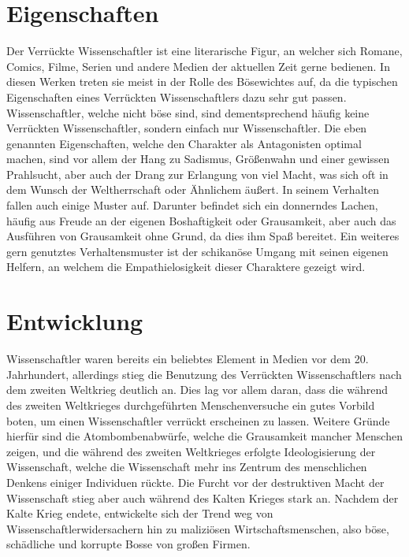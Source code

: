 \documentclass[12pt]{scrreprt}
\begin{document}
\section{Eigenschaften}
	\label{sec:eigenschaften}
Der Verrückte Wissenschaftler ist eine literarische Figur, an welcher sich Romane, Comics, Filme, Serien und andere Medien der aktuellen Zeit gerne bedienen.
In diesen Werken treten sie meist in der Rolle des Bösewichtes auf, da die typischen Eigenschaften eines Verrückten Wissenschaftlers dazu sehr gut passen.
Wissenschaftler, welche nicht böse sind, sind dementsprechend häufig keine Verrückten Wissenschaftler, sondern einfach nur Wissenschaftler. 
Die eben genannten Eigenschaften, welche den Charakter als Antagonisten optimal machen, sind vor allem der Hang zu Sadismus, Größenwahn und einer gewissen Prahlsucht, aber auch der Drang zur Erlangung von viel Macht, was sich oft in dem Wunsch der Weltherrschaft oder Ähnlichem äußert.
In seinem Verhalten fallen auch einige Muster auf.
Darunter befindet sich ein donnerndes Lachen, häufig aus Freude an der eigenen Boshaftigkeit oder Grausamkeit, aber auch das Ausführen von Grausamkeit ohne Grund, da dies ihm Spaß bereitet.
Ein weiteres gern genutztes Verhaltensmuster ist der schikanöse Umgang mit seinen eigenen Helfern, an welchem die Empathielosigkeit dieser Charaktere gezeigt wird.
\autocite{wiki:Verrückter_Wissenschaftler}
\section{Entwicklung}
	\label{sec:entwicklung}
Wissenschaftler waren bereits ein beliebtes Element in Medien vor dem 20. Jahrhundert, allerdings stieg die Benutzung des Verrückten Wissenschaftlers nach dem zweiten Weltkrieg deutlich an.
Dies lag vor allem daran, dass die während des zweiten Weltkrieges durchgeführten Menschenversuche ein gutes Vorbild boten, um einen Wissenschaftler verrückt erscheinen zu lassen.
Weitere Gründe hierfür sind die Atombombenabwürfe, welche die Grausamkeit mancher Menschen zeigen, und die während des zweiten Weltkrieges erfolgte Ideologisierung der Wissenschaft, welche die Wissenschaft mehr ins Zentrum des menschlichen Denkens einiger Individuen rückte.
Die Furcht vor der destruktiven Macht der Wissenschaft stieg aber auch während des Kalten Krieges stark an.
Nachdem der Kalte Krieg endete, entwickelte sich der Trend weg von Wissenschaftlerwidersachern hin zu maliziösen Wirtschaftsmenschen, also böse, schädliche und korrupte Bosse von großen Firmen.
\autocite{wiki:Verrückter_Wissenschaftler}
\end{document}

